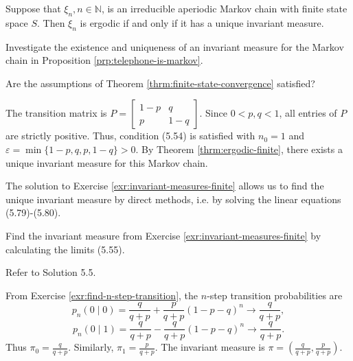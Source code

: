 \begin{Theorem}
\label{thrm:ergodic-finite}
Suppose that $\xi_n, n \in \mathbb{N}$, is an irreducible aperiodic Markov chain with finite state space $S$. Then $\xi_n$ is ergodic if and only if it has a unique invariant measure.
\end{Theorem}

\begin{Exercise}
\label{exr:invariant-measures-finite}
Investigate the existence and uniqueness of an invariant measure for the Markov chain in Proposition \ref{prp:telephone-is-markov}.

\begin{hint}
Are the assumptions of Theorem \ref{thrm:finite-state-convergence} satisfied?
\end{hint}
\end{Exercise}

\begin{Solution}
The transition matrix is $P = \begin{bmatrix} 1-p & q \\ p & 1-q \end{bmatrix}$. Since $0 < p, q < 1$, all entries of $P$ are strictly positive. Thus, condition (5.54) is satisfied with $n_0 = 1$ and $\varepsilon = \min\{1-p, q, p, 1-q\} > 0$.
By Theorem \ref{thrm:ergodic-finite}, there exists a unique invariant measure for this Markov chain.
\end{Solution}

\begin{Remark}
\label{rem:solve-invariant-directly}
The solution to Exercise \ref{exr:invariant-measures-finite} allows us to find the unique invariant measure by direct methods, i.e. by solving the linear equations (5.79)-(5.80).
\end{Remark}

\begin{Exercise}
\label{exr:find-invariant-limit}
Find the invariant measure from Exercise \ref{exr:invariant-measures-finite} by calculating the limits (5.55).

\begin{hint}
Refer to Solution 5.5.
\end{hint}
\end{Exercise}

\begin{Solution}
From Exercise \ref{exr:find-n-step-transition}, the $n$-step transition probabilities are
\[
p_n(0 \mid 0) = \frac{q}{q+p} + \frac{p}{q+p}(1-p-q)^n \to \frac{q}{q+p},
\]
\[
p_n(0 \mid 1) = \frac{q}{q+p} - \frac{q}{q+p}(1-p-q)^n \to \frac{q}{q+p}.
\]
Thus $\pi_0 = \frac{q}{q+p}$. Similarly, $\pi_1 = \frac{p}{q+p}$. The invariant measure is $\pi = \left( \frac{q}{q+p}, \frac{p}{q+p} \right)$.
\end{Solution}

